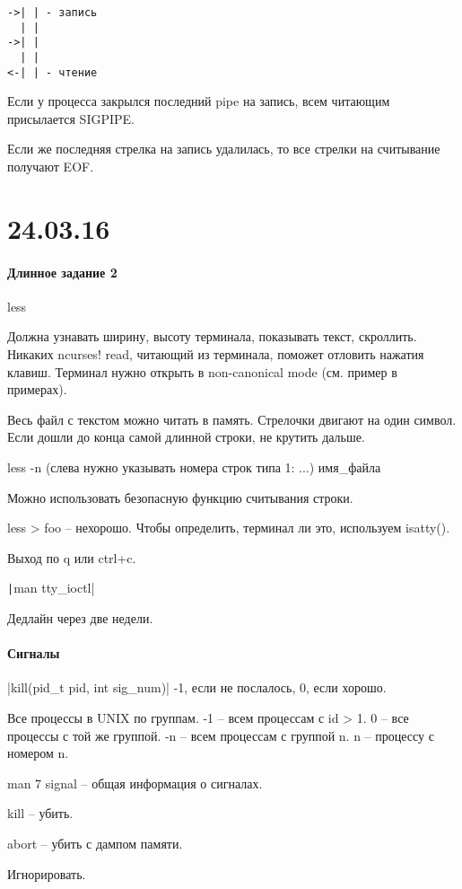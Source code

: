\documentclass[a4paper,10pt]{article}
\newcommand{\cl}{\mint{c}}
\begin{document}
\begin{verbatim}
->| | - запись
  | |
->| |
  | |
<-| | - чтение
\end{verbatim}

Если у процесса закрылся последний pipe на запись, всем читающим присылается  SIGPIPE.

Если же последняя стрелка на запись удалилась, то все стрелки на считывание получают EOF.

\section{24.03.16}
\paragraph{Длинное задание 2}
less

Должна узнавать ширину, высоту терминала, показывать текст, скроллить. Никаких ncurses! read, читающий из терминала, поможет отловить нажатия клавиш. Терминал нужно открыть в non-canonical mode (см. пример в примерах).

Весь файл с текстом можно читать в память. Стрелочки двигают на один символ. Если дошли до конца самой длинной строки, не крутить дальше.

less -n (слева нужно указывать номера строк типа 1: ...) имя\_файла

Можно использовать безопасную функцию считывания строки.

less > foo -- нехорошо. Чтобы определить, терминал ли это, используем isatty().

Выход по q или ctrl+c.

\texttt|man tty_ioctl|

Дедлайн через две недели.

\paragraph{Сигналы}
\cl|kill(pid_t pid, int sig_num)|
-1, если не послалось, 0, если хорошо.

Все процессы в UNIX по группам. -1 -- всем процессам с id > 1. 0 -- все процессы с той же группой. -n -- всем процессам с группой n. n -- процессу с номером n.

man 7 signal -- общая информация о сигналах. 

kill -- убить.

abort -- убить с дампом памяти.

Игнорировать.
\end{document}
